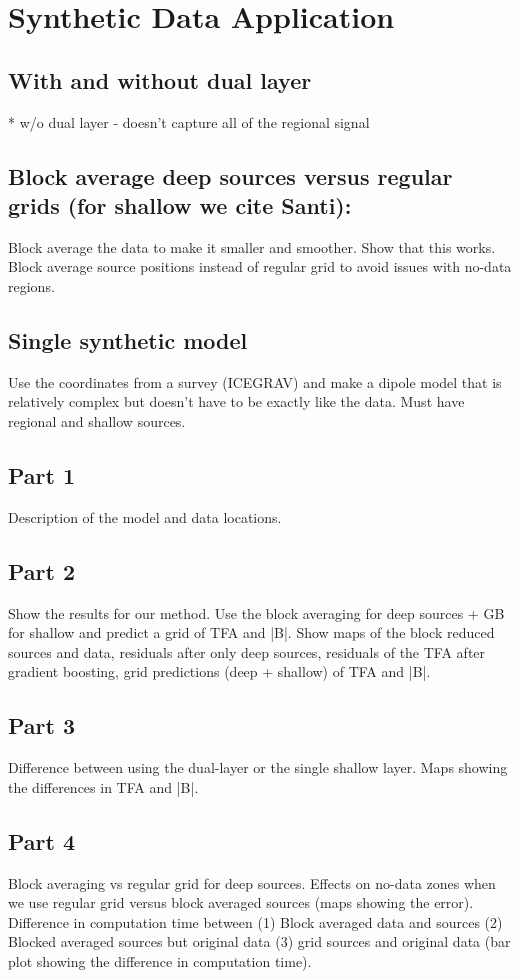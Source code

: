 \section{Synthetic Data Application}

\subsection{With and without dual layer}
* w/o dual layer - doesn't capture all of the regional signal

\subsection{Block average deep sources versus regular grids (for shallow we cite Santi):}
Block average the data to make it smaller and smoother. Show that this works.
Block average source positions instead of regular grid to avoid issues with no-data regions.

\subsection{Single synthetic model}
Use the coordinates from a survey (ICEGRAV) and make a dipole model that is relatively complex but doesn't have to be exactly like the data. Must have regional and shallow sources.


\subsection{Part 1}
Description of the model and data locations.

\subsection{Part 2}
Show the results for our method. Use the block averaging for deep sources + GB for shallow and predict a grid of TFA and |B|. Show maps of the block reduced sources and data, residuals after only deep sources, residuals of the TFA after gradient boosting, grid predictions (deep + shallow) of TFA and |B|.

\subsection{Part 3}
Difference between using the dual-layer or the single shallow layer. Maps showing the differences in TFA and |B|.

\subsection{Part 4}
Block averaging vs regular grid for deep sources. Effects on no-data zones when we use regular grid versus block averaged sources (maps showing the error). Difference in computation time between (1) Block averaged data and sources (2) Blocked averaged sources but original data (3) grid sources and original data (bar plot showing the difference in computation time).


